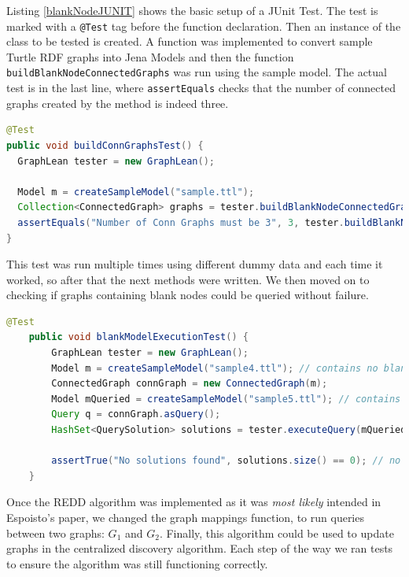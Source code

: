Listing \ref{blankNodeJUNIT} shows the basic setup of a JUnit Test. The test is marked with a \texttt{@Test} tag before the function declaration. Then an instance of the class to be tested is created. A function was implemented to convert sample Turtle RDF graphs into Jena Models and then the function \texttt{buildBlankNodeConnectedGraphs} was run using the sample model. The actual test is in the last line, where \texttt{assertEquals} checks that the number of connected graphs created by the method is indeed three.

\begin{lstlisting}[language=JAVA, caption={A very trivial test, that checks the correct number of connected graphs in a sample graph is correct for the sample data, in this case sample.ttl contains 3 connected subgraphs.}, label={blankNodeJUNIT}]
@Test
public void buildConnGraphsTest() {
  GraphLean tester = new GraphLean();

  Model m = createSampleModel("sample.ttl");
  Collection<ConnectedGraph> graphs = tester.buildBlankNodeConnectedGraphs(m);
  assertEquals("Number of Conn Graphs must be 3", 3, tester.buildBlankNodeConnectedGraphs(m).size());
}
\end{lstlisting}

This test was run multiple times using different dummy data and each time it worked, so after that the next methods were written. We then moved on to checking if graphs containing blank nodes could be queried without failure.


\begin{lstlisting}[language=JAVA, caption={This test checks if a model containign blank nodes can be queried without returning an error.}]
@Test
	public void blankModelExecutionTest() {
		GraphLean tester = new GraphLean();
		Model m = createSampleModel("sample4.ttl"); // contains no blank nodes
		ConnectedGraph connGraph = new ConnectedGraph(m);
		Model mQueried = createSampleModel("sample5.ttl"); // contains blanks
		Query q = connGraph.asQuery();
		HashSet<QuerySolution> solutions = tester.executeQuery(mQueried, q);

		assertTrue("No solutions found", solutions.size() == 0); // no solutions expected
	}
\end{lstlisting}

Once the REDD algorithm was implemented as it was \textit{most likely} intended in Espoisto's paper, we changed the graph mappings function, to run queries between two graphs: $G_1$ and $G_2$. Finally, this algorithm could be used to update graphs in the centralized discovery algorithm. Each step of the way we ran tests to ensure the algorithm was still functioning correctly.

